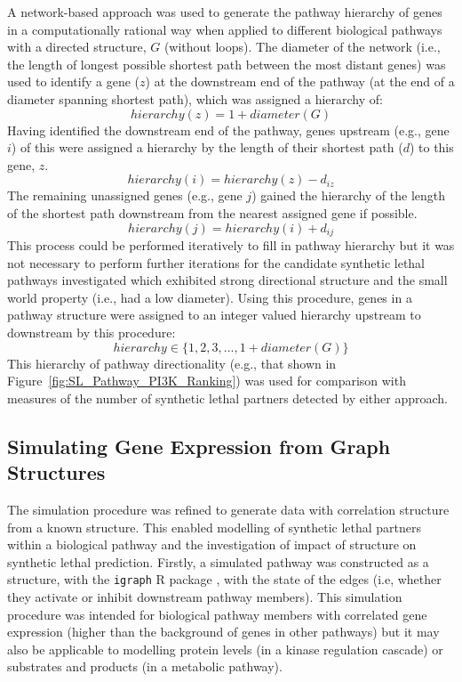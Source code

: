 A network-based approach was used to generate the pathway hierarchy of genes in a computationally rational way when applied to different biological pathways with a directed  structure, $G$ (without loops). The diameter of the network (i.e., the length of longest possible \gls{shortest path} between the most distant genes) was used to identify a gene ($z$) at the downstream end of the pathway (at the end of a diameter spanning \gls{shortest path}), which was assigned a hierarchy of: $$hierarchy(z) = 1 + diameter(G)$$ Having identified the downstream end of the pathway, genes upstream (e.g., gene $i$) of this were assigned a hierarchy by the length of their \gls{shortest path} ($d$) to this gene, $z$. $$hierarchy(i) = hierarchy(z) - d_{iz}$$ The remaining unassigned genes (e.g., gene $j$) gained the hierarchy of the length of the \gls{shortest path} downstream from the nearest assigned gene if possible. $$hierarchy(j) = hierarchy(i) + d_{ij}$$ This process could be performed iteratively to fill in pathway hierarchy but it was not necessary to perform further iterations for the candidate \gls{synthetic lethal} pathways investigated which exhibited strong directional structure and the \gls{small world} property (i.e., had a low diameter). Using this procedure, genes in a pathway  structure were assigned to an integer valued hierarchy upstream to downstream by this procedure: $$hierarchy \in \{1, 2, 3, ..., 1 + diameter(G)\}$$
This hierarchy of pathway directionality (e.g.,  that shown in Figure~\ref{fig:SL_Pathway_PI3K_Ranking}) was used for comparison with measures of the number of \gls{synthetic lethal} partners detected by either approach.

\subsection{Simulating Gene Expression from Graph Structures} \label{methods:graphsim}
The simulation procedure was refined to generate  data with correlation structure from a known  structure. %
This enabled modelling of \gls{synthetic lethal} partners within a biological pathway and the investigation of impact of  structure on \gls{synthetic lethal} prediction. Firstly, a simulated pathway was constructed as a  structure, with the \texttt{igraph} R package \citet{igraph}, with the state of the \glspl{edge} (i.e, whether they activate or inhibit downstream pathway members). This simulation procedure was intended for biological pathway members with correlated \gls{gene expression} (higher than the background of genes in other pathways) but it may also be applicable to modelling protein levels (in a kinase regulation cascade) or substrates and products (in a metabolic pathway).%

